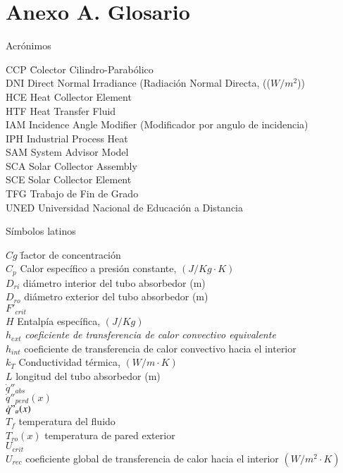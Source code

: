 \chapter* {Anexo A. Glosario}

Acrónimos

\begin{tabbing}	
CCP \quad\= Colector Cilindro-Parabólico  \\
DNI \> Direct Normal Irradiance (Radiación Normal Directa, (($W/m^2$)) \\
HCE \> Heat Collector Element \\
HTF \> Heat Transfer Fluid \\
IAM \> Incidence Angle Modifier (Modificador por angulo de incidencia) \\
IPH \> Industrial Process Heat \\
SAM\> System Advisor Model \\
SCA \> Solar Collector Assembly\\
SCE \> Solar Collector Element \\
TFG	\>Trabajo de Fin de Grado \\
UNED \> Universidad Nacional de Educación a Distancia \\
\end{tabbing}


Símbolos latinos

\begin{tabbing}
$Cg$ \quad\=  factor de concentración \\
$C_p$ \> Calor específico a presión constante, $(J/Kg\cdot K)$ \\
$D_{ri}$  diámetro interior del tubo absorbedor (m) \\
$D_{ro}$ \> diámetro exterior del tubo absorbedor (m)   \\
$F'_{crit}$ \> \\
$H$ \> Entalpía específica, $(J/Kg)$ \\
$h_{ext}$ \> \textit{coeficiente de transferencia de calor convectivo equivalente} \\
$h_{int}$ \> coeficiente de transferencia de calor convectivo hacia el interior \\
$k_T$ \> Conductividad térmica, $(W/m \cdot K)$ \\
$L$  \> longitud del tubo absorbedor (m) \\
$\dot q''_{abs}$ \> \\
$\dot q''_{perd}(x)$ \> \\
$ \dot q"_{u}(x)$ \> \\ 
$T_{f}$ \> temperatura del fluido \\
$T_{ro}(x)$ \> temperatura de pared exterior \\
$U_{crit}$ \> \\
$U_{rec}$  \> coeficiente global de transferencia de calor hacia el interior $(W/m^{2}\cdot K)$  \\
\end{tabbing}


